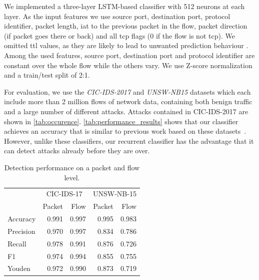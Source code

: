 \documentclass[conference]{IEEEtran}
\begin{document}
We implemented a three-layer LSTM-based classifier with 512 neurons at each layer. As the input features we use 
source port, destination port, protocol identifier, packet length, \gls{iat} to the previous packet in the flow, packet direction (if packet goes there or back) and all \gls{tcp} flags (0 if the flow is not \gls{tcp}).
We omitted \gls{ttl} values, as they are likely to lead to unwanted prediction behaviour \cite{bachl_walling_2019}.  Among the used features, source port, destination port and protocol identifier are constant over the whole flow while the others vary.
We use Z-score normalization and a train/test split of 2:1.

For evaluation, we use the \textit{CIC-IDS-2017} \cite{sharafaldin_toward_2018} and \textit{UNSW-NB15} \cite{moustafa_unsw-nb15:_2015} datasets which each include more than 2 million flows of network data, containing both benign traffic and a large number of different attacks. Attacks contained in CIC-IDS-2017 are shown in \autoref{tab:occurence}.
\autoref{tab:performance_results} shows that our classifier achieves an accuracy that is similar to previous work based on these datasets~\cite{meghdouri_analysis_2018,bachl_walling_2019}. However, unlike these classifiers, our recurrent classifier has the advantage that it can detect attacks already before they are over.

\begin{table}
\caption{Detection performance on a packet and flow level.} \label{tab:performance_results}
\centering
\begin{tabular}{l r r r r} \toprule
& \multicolumn{2}{c}{CIC-IDS-17} & \multicolumn{2}{c}{UNSW-NB-15} \\
	&	Packet	&	Flow	&	Packet	&	Flow	\\	\midrule
Accuracy	&	0.991	&	0.997	&	0.995	&	0.983	\\	
Precision	&	0.970	&	0.997	&	0.834	&	0.786	\\	
Recall	&	0.978	&	0.991	&	0.876	&	0.726	\\	
F1	&	0.974	&	0.994	&	0.855	&	0.755	\\	
Youden	&	0.972	&	0.990	&	0.873	&	0.719	\\	


\bottomrule
\end{tabular}
\end{table}
\end{document}
